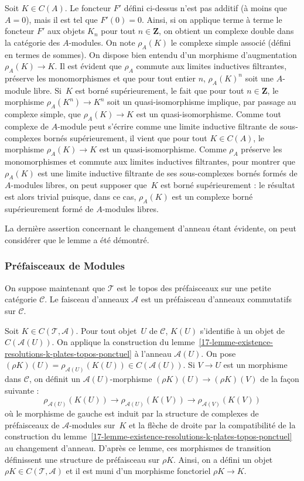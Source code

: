 \documentclass[10pt]{../fichiers-configuration-latex/smfart}
\begin{document}
Soit $K\in C(A)$. Le foncteur $F'$ défini ci-dessus n'est pas additif (à
moins que $A=0$), mais il est tel que $F'(0)=0$. Ainsi, si on applique
terme à terme le foncteur $F'$ aux objets $K_n$ pour tout $n\in\mathbf{Z}$,
on obtient un complexe double dans la catégorie des $A$-modules. On note
$\rho_A(K)$ le complexe simple associé (défini en termes de sommes). On
dispose bien entendu d'un morphisme d'augmentation $\rho_A(K)\to K$. Il
est évident que $\rho_A$ commute aux limites inductives filtrantes,
préserve les monomorphismes et que pour tout entier $n$, $\rho_A(K)^n$
soit une $A$-module libre. Si $K$ est borné supérieurement, le fait que
pour tout $n\in\mathbf{Z}$, le morphisme $\rho_A(K^n)\to K^n$ soit un
quasi-isomorphisme implique, par passage au complexe simple, que
$\rho_A(K)\to K$ est un quasi-isomorphisme. Comme tout complexe de
$A$-module peut s'écrire comme une limite inductive filtrante de
sous-complexes bornés supérieurement, il vient que pour tout $K\in C(A)$,
le morphisme $\rho_A(K)\to K$ est un quasi-isomorphisme. Comme
$\rho_A$ préserve les monomorphismes et commute aux limites inductives
filtrantes, pour montrer que $\rho_A(K)$ est une limite inductive
filtrante de ses sous-complexes bornés formés de $A$-modules libres, on
peut supposer que $K$ est borné supérieurement : le résultat est alors
trivial puisque, dans ce cas, $\rho_A(K)$ est un complexe borné
supérieurement formé de $A$-modules libres.

La dernière assertion concernant le changement d'anneau étant évidente, on
peut considérer que le lemme a été démontré.

\subsubsection{Préfaisceaux de Modules}%
\label{17-subsubsection-produit-tensoriel-derive-prefaisceaux}

On suppose maintenant que $\mathscr T$ est le topos des préfaisceaux sur
une petite catégorie $\mathscr C$. Le faisceau d'anneaux $\mathscr A$ est
un préfaisceau d'anneaux commutatifs sur $\mathscr C$.

Soit $K\in C(\mathscr T,\mathscr A)$. Pour tout objet $U$ de $\mathscr C$,
$K(U)$ s'identifie à un objet de $C(\mathscr A(U))$. On applique la
construction du
lemme~\ref{17-lemme-existence-resolutions-k-plates-topos-ponctuel} à l'anneau
$\mathscr A(U)$. On pose $(\rho K)(U)=\rho_{\mathscr A(U)}(K(U))\in
C(\mathscr A(U))$. Si $V\to U$ est un morphisme dans $\mathscr C$, on
définit un $\mathscr A(U)$-morphisme $(\rho K)(U)\to (\rho K)(V)$ de la
façon suivante :
\[\rho_{\mathscr A(U)}(K(U))\to \rho_{\mathscr A(U)}(K(V))\to
\rho_{\mathscr A(V)}(K(V))\]
où le morphisme de gauche est induit par la structure de complexes de 
préfaisceaux de $\mathscr A$-modules sur $K$ et la flèche de droite par la
compatibilité de la construction du
lemme~\ref{17-lemme-existence-resolutions-k-plates-topos-ponctuel} au
changement d'anneau. D'après ce lemme, ces morphismes de transition
définissent une structure de préfaisceau sur $\rho K$. Ainsi, on a défini
un objet $\rho K\in C(\mathscr T,\mathscr A)$ et il est muni d'un morphisme
fonctoriel $\rho K \to K$.
\end{document}
